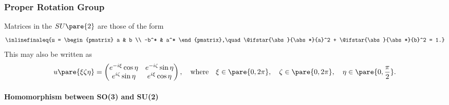 \documentclass[hidelinks]{article}
\makeatletter
\DeclarePairedDelimiter\abs{\lvert}{\rvert}%
\let\oldabs\abs
\def\abs{\@ifstar{\oldabs}{\oldabs*}}
\makeatother
\begin{document}
\subsubsection{Proper Rotation Group} %
\label{ssub:proper_rotation_group}

Matrices in the $SU\pare{2}$ are those of the form
\[ \inlinefinaleq{u = \begin{pmatrix}
    a & b \\
    -b^* & a^*
\end{pmatrix},\quad \abs{a}^2 + \abs{b}^2 = 1.} \]
This may also be written as
\[ u\pare{\xi\zeta\eta} = \begin{pmatrix}
    e^{-i\xi}\cos\eta & e^{-i\zeta}\sin\eta \\
    e^{i\zeta}\sin\eta & e^{i\xi}\cos\eta
\end{pmatrix},\quad \text{where}\quad \xi \in \pare{0,2\pi},\quad \zeta\in\pare{0,2\pi},\quad \eta\in\pare{0,\frac{\pi}{2}}. \]

\paragraph{Homomorphism between SO(3) and SU(2)} %
\label{par:homomorphism}
\end{document}
